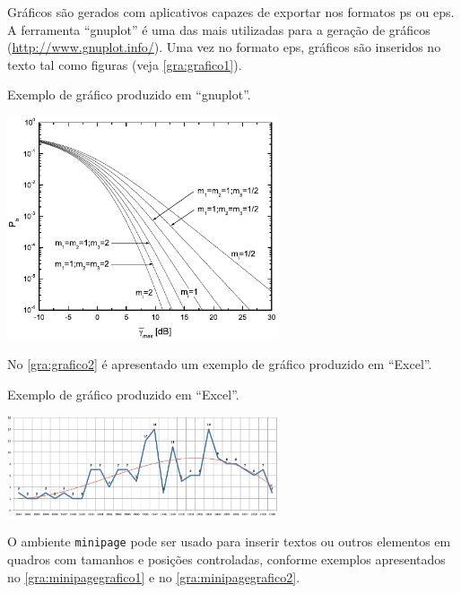 Gráficos são gerados com aplicativos capazes de exportar nos formatos \gls{ps} ou \gls{eps}. A ferramenta ``gnuplot'' é uma das mais utilizadas para a geração de gráficos (\url{http://www.gnuplot.info/}). Uma vez no formato \gls{eps}, gráficos são inseridos no texto tal como figuras (veja \autoref{gra:grafico1}).

\begin{graph}[htb]%
\captionsetup{width=0.6\textwidth}%
\caption{Exemplo de gráfico produzido em ``gnuplot''.}%
\label{gra:grafico1}%
\includegraphics[width=0.6\textwidth]{./CapituloExemplo/grafico1}%
\end{graph}

No \autoref{gra:grafico2} é apresentado um exemplo de gráfico produzido em ``Excel''.

\begin{graph}[htb]%
\captionsetup{width=0.6\textwidth}%
\caption{Exemplo de gráfico produzido em ``Excel''.}%
\label{gra:grafico2}%
\includegraphics[width=0.6\textwidth]{./CapituloExemplo/grafico2}%
\end{graph}

O ambiente \texttt{minipage} pode ser usado para inserir textos ou outros elementos em quadros com tamanhos e posições controladas, conforme exemplos apresentados no \autoref{gra:minipagegrafico1} e no \autoref{gra:minipagegrafico2}.

